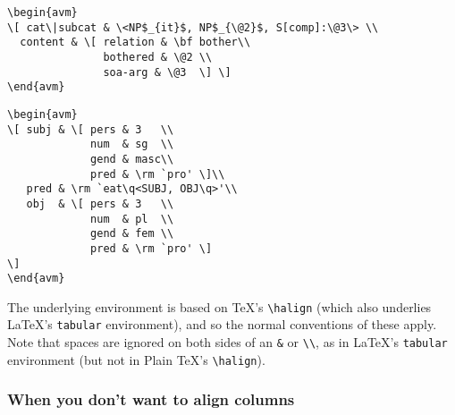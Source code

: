 \begin{examples}

\item
{\obeyspaces
\begin{verbatim}
\begin{avm}
\[ cat\|subcat & \<NP$_{it}$, NP$_{\@2}$, S[comp]:\@3\> \\
  content & \[ relation & \bf bother\\
               bothered & \@2 \\
               soa-arg & \@3  \] \]
\end{avm}
\end{verbatim}}

\item
{\obeyspaces
\begin{verbatim}
\begin{avm}
\[ subj & \[ pers & 3   \\
             num  & sg  \\
             gend & masc\\
             pred & \rm `pro' \]\\
   pred & \rm `eat\q<SUBJ, OBJ\q>'\\
   obj  & \[ pers & 3   \\
             num  & pl  \\
             gend & fem \\
             pred & \rm `pro' \]
\]
\end{avm}
\end{verbatim}}
\end{examples}
The underlying environment is based on \TeX's \verb+\halign+ (which also
underlies \LaTeX's \verb+tabular+ environment), and so the normal
conventions of these apply.  Note that spaces are ignored on both sides of
an \verb+&+ or \verb+\\+, as in \LaTeX's \verb+tabular+ environment (but not
in Plain \TeX's \verb+\halign+).

\subsubsection{When you don't want to align columns}


